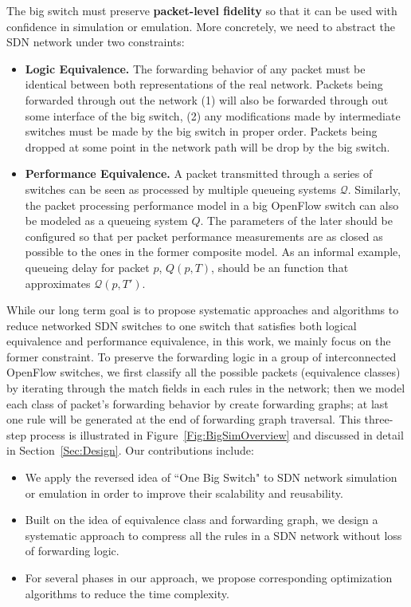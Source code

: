The big switch must preserve \textbf{packet-level fidelity} so that
it can be used with confidence in simulation or emulation.
More concretely, we need to abstract the SDN network under two constraints:
\begin{itemize}
\item \textbf{Logic Equivalence.} The forwarding behavior of any packet must be identical
        between both representations of the real network. Packets being
        forwarded through out the network (1) will also be forwarded through out
        some interface of the big switch, (2) any modifications made by
        intermediate switches must be made by the big switch in proper order.
        Packets being dropped at some point in the network path will be drop by the
        big switch.
\item \textbf{Performance Equivalence.} A packet transmitted through a series of
        switches can be seen as processed by multiple queueing systems $\mathcal{Q}$.
        Similarly, the packet processing performance model in a big OpenFlow switch can
        also be modeled as a queueing system $Q$.
        The parameters of the later should be configured so that per packet performance
        measurements are as closed as possible to the ones in the former composite model.
        As an informal example, queueing delay for packet $p$, $Q(p, T)$, should be an
        function that approximates $\mathcal{Q}(p, T')$.
\end{itemize}

While our long term goal is to propose systematic approaches and algorithms to reduce
networked SDN switches to one switch that satisfies both logical equivalence and performance
equivalence, in this work, we mainly focus on the former constraint.
To preserve the forwarding logic in a group of interconnected OpenFlow switches,
we first classify all the possible packets (equivalence classes) by iterating through
the match fields in each rules in the network;
then we model each class of packet's forwarding behavior by create forwarding graphs;
at last one rule will be generated at the end of forwarding graph traversal.
This three-step process is illustrated in Figure~\ref{Fig:BigSimOverview} and discussed
in detail in Section~\ref{Sec:Design}.
Our contributions include:
\begin{itemize}
\item We apply the reversed idea of ``One Big Switch"\cite{OneBigSwitchAbstraction}
        to SDN network simulation or emulation in order to
        improve their scalability and reusability.
\item Built on the idea of equivalence class and forwarding graph, we design
        a systematic approach to compress all the rules in a SDN network without
        loss of forwarding logic.
\item For several phases in our approach, we propose corresponding optimization
        algorithms to reduce the time complexity.
\end{itemize}

